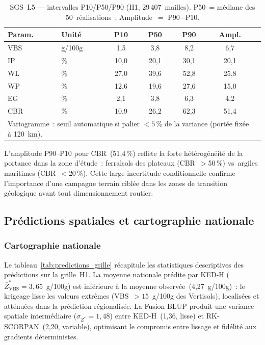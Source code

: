 \documentclass[10pt,a4paper,twocolumn]{article}
\begin{document}
	\begin{table}[htbp]
		\centering\small
		\caption{SGS~L5 --- intervalles P10/P50/P90 (H1, 29\,407~mailles).
			P50~= médiane des 50~réalisations~;
			Amplitude~$=$ P90$-$P10.}
		\label{tab:sgs}
		\setlength{\tabcolsep}{2.5pt}
		\begin{tabular}{llccccc}
			\toprule
			Param. & Unité & P10 & P50 & P90 & Ampl. \\
			\midrule
			VBS  & g/100g & 1{,}5 & 3{,}8 & 8{,}2 & 6{,}7 \\
			IP   & \%     & 10{,}0& 20{,}1& 30{,}1& 20{,}1 \\
			WL   & \%     & 27{,}0& 39{,}6& 52{,}8& 25{,}8 \\
			WP   & \%     & 12{,}6& 19{,}6& 27{,}6& 15{,}0 \\
			EG   & \%     & 2{,}1 & 3{,}8 & 6{,}3 & 4{,}2 \\
			CBR  & \%     & 10{,}9& 26{,}2& 62{,}3& 51{,}4 \\
			\bottomrule
			\multicolumn{6}{p{8cm}}{\footnotesize Variogramme~: seuil automatique si
			palier $<5$\,\% de la variance (portée fixée à 120~km).}
		\end{tabular}
	\end{table}

	L'amplitude P90--P10 pour CBR~(51{,}4\,\%) reflète la forte
	hétérogénéité de la portance dans la zone d'étude~:
	ferralsols des plateaux (CBR~$>$50\,\%)
	vs~argiles maritimes (CBR~$<$20\,\%).
	Cette large incertitude conditionnelle confirme l'importance
	d'une campagne terrain ciblée dans les zones de transition
	géologique avant tout dimensionnement routier.

	\subsection{Prédictions spatiales et cartographie nationale}
	\label{subsec:cartes}
	
	\subsubsection{Cartographie nationale}

	Le tableau~\ref{tab:predictions_grille} récapitule les
	statistiques descriptives des prédictions sur la grille~H1.
	La moyenne nationale prédite par KED-H
	($\bar{Z}^*_{\mathrm{VBS}}=3{,}65$~g/100g) est inférieure
	à la moyenne observée~(4{,}27~g/100g)~: le krigeage lisse
	les valeurs extrêmes (VBS~$>15$~g/100g des Vertisols),
	localisées et atténuées dans la prédiction régionalisée.
	La Fusion BLUP produit une variance spatiale intermédiaire
	($\sigma_{Z^*}=1{,}48$) entre KED-H~(1{,}36, lisse) et
	RK-SCORPAN~(2{,}20, variable), optimisant le compromis
	entre lissage et fidélité aux gradients déterministes.
\end{document}
